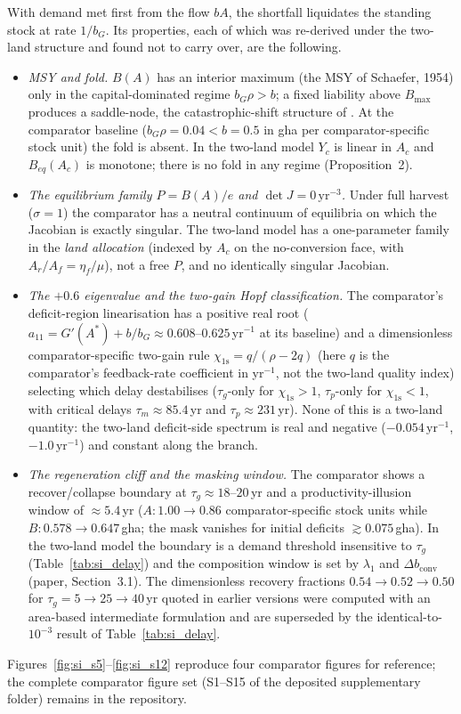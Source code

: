 \documentclass[11pt,a4paper]{article}
\newcommand{\dconv}{\Delta b_{\mathrm{conv}}}
\begin{document}
With demand met first from the flow $bA$, the shortfall liquidates the standing stock at rate $1/b_G$. Its properties, each of which was re-derived under the two-land structure and found not to carry over, are the following.
\begin{itemize}[leftmargin=1.5em]
\item \emph{MSY and fold.} $B(A)$ has an interior maximum (the MSY of Schaefer, 1954) only in the capital-dominated regime $b_G\rho>b$; a fixed liability above $B_{\max}$ produces a saddle-node, the catastrophic-shift structure of \citet{Scheffer2001}. At the comparator baseline ($b_G\rho=0.04<b=0.5$ in gha per comparator-specific stock unit) the fold is absent. In the two-land model $Y_c$ is linear in $A_c$ and $B_{eq}(A_c)$ is monotone; there is no fold in any regime (Proposition~2).
\item \emph{The equilibrium family $P=B(A)/e$ and $\det J=0\,\mathrm{yr}^{-3}$.} Under full harvest ($\sigma=1$) the comparator has a neutral continuum of equilibria on which the Jacobian is exactly singular. The two-land model has a one-parameter family in the \emph{land allocation} (indexed by $A_c$ on the no-conversion face, with $A_r/A_f=\eta_f/\mu$), not a free $P$, and no identically singular Jacobian.
\item \emph{The $+0.6$ eigenvalue and the two-gain Hopf classification.} The comparator's deficit-region linearisation has a positive real root ($a_{11}=G'(A^*)+b/b_G\approx0.608$--$0.625$\,yr$^{-1}$ at its baseline) and a dimensionless comparator-specific two-gain rule $\chi_{\mathrm{1s}}=q/(\rho-2q)$ (here $q$ is the comparator's feedback-rate coefficient in yr$^{-1}$, not the two-land quality index) selecting which delay destabilises ($\tau_g$-only for $\chi_{\mathrm{1s}}>1$, $\tau_p$-only for $\chi_{\mathrm{1s}}<1$, with critical delays $\tau_m\approx85.4$\,yr and $\tau_p\approx231$\,yr). None of this is a two-land quantity: the two-land deficit-side spectrum is real and negative ($-0.054\,\mathrm{yr}^{-1}$, $-1.0\,\mathrm{yr}^{-1}$) and constant along the branch.
\item \emph{The regeneration cliff and the masking window.} The comparator shows a recover/collapse boundary at $\tau_g\approx18$--$20$\,yr and a productivity-illusion window of $\approx5.4$\,yr ($A:1.00\to0.86$ comparator-specific stock units while $B:0.578\to0.647$\,gha; the mask vanishes for initial deficits $\gtrsim0.075$\,gha). In the two-land model the boundary is a demand threshold insensitive to $\tau_g$ (Table~\ref{tab:si_delay}) and the composition window is set by $\lambda_1$ and $\dconv$ (paper, Section~3.1). The dimensionless recovery fractions $0.54\to0.52\to0.50$ for $\tau_g=5\to25\to40$\,yr quoted in earlier versions were computed with an area-based intermediate formulation and are superseded by the identical-to-$10^{-3}$ result of Table~\ref{tab:si_delay}.
\end{itemize}
Figures~\ref{fig:si_s5}--\ref{fig:si_s12} reproduce four comparator figures for reference; the complete comparator figure set (S1--S15 of the deposited supplementary folder) remains in the repository.
\end{document}
